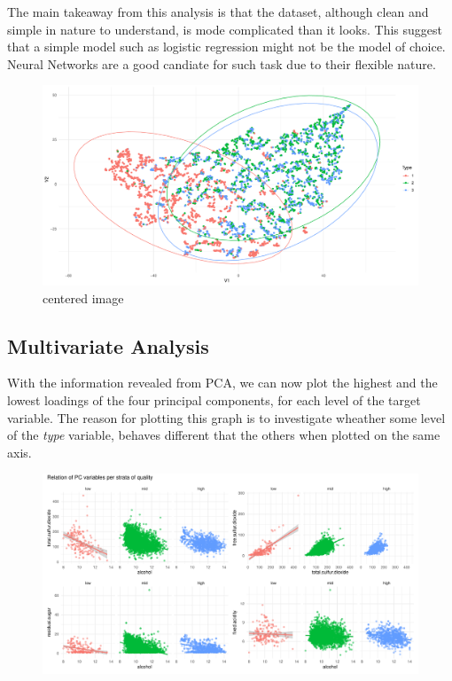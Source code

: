 \documentclass[11pt,twoside]{article}
\numberwithin{Theorem}{section}
\numberwithin{Definition}{section}
\numberwithin{Lemma}{section}
\numberwithin{Algorithm}{section}
\numberwithin{equation}{section}
\begin{document}
The main takeaway from this analysis is that the dataset, although clean and simple in nature to understand, is mode complicated than it looks. This suggest that a simple model such as logistic regression might not be the model of choice. Neural Networks are a good candiate for such task due to their flexible nature. 

\vspace*{1em}
\begin{figure}[!h]
\centering
\includegraphics[width=\textwidth]{./output/1.d.t-sne.pdf}
\caption{centered image}
\label{fig:sne_biplot}
\end{figure}
\vspace{2em}


\subsection{Multivariate Analysis}
\label{sec:multivariate}

With the information revealed from PCA, we can now plot the highest and the lowest loadings of the four principal components, for each level of the target variable. The reason for plotting this graph is to investigate wheather some level of the \textit{type} variable, behaves different that the others when plotted on the same axis. 

\vspace*{1em}
\begin{figure}[!h]
\centering
\includegraphics[width=\textwidth]{./output/1.g.multivariate-analysis.pdf}
\caption{}
\label{fig:multi}
\end{figure}
\vspace{2em}
\end{document}
